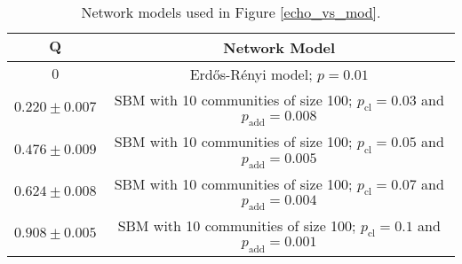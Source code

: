 \documentclass[11 pt , letterpaper , twoside , openright]{book}
\begin{document}
\begin{table}[H]
\centering
\setlength{\tabcolsep}{10pt} %
\renewcommand{\arraystretch}{1.5} %
\begin{tabular}{c | c}
$\bm{Q}$ & \textbf{Network Model} \\
\hline
$0$ & Erd\H{o}s-R\'{e}nyi model; $p=0.01$ \\
$0.220 \pm 0.007$ & SBM with 10 communities of size 100; $p_{\text{cl}} = 0.03$ and $p_{\text{add}} = 0.008$ \\
$0.476 \pm 0.009$ & SBM with 10 communities of size 100; $p_{\text{cl}} = 0.05$ and $p_{\text{add}} = 0.005$ \\
$0.624 \pm 0.008$ & SBM with 10 communities of size 100; $p_{\text{cl}} = 0.07$ and $p_{\text{add}} = 0.004$ \\
$0.908 \pm 0.005$ & SBM with 10 communities of size 100; $p_{\text{cl}} = 0.1$ and $p_{\text{add}} = 0.001$ \\
\end{tabular}
\caption{Network models used in Figure \ref{echo_vs_mod}.}
\label{tab1}
\end{table}
\end{document}

